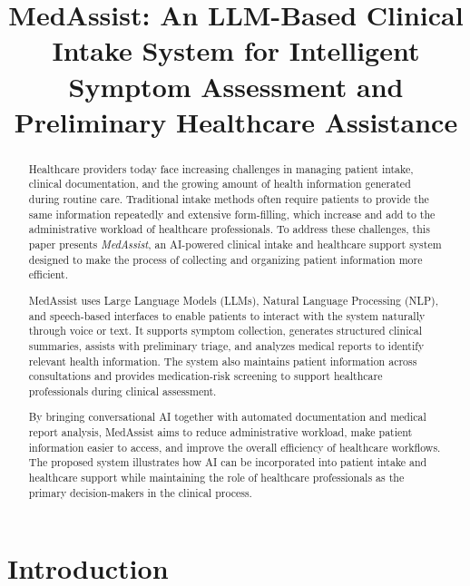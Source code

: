 \documentclass[conference]{IEEEtran}
\begin{document}
\raggedbottom

\title{MedAssist: An LLM-Based Clinical Intake System for Intelligent Symptom Assessment and Preliminary Healthcare Assistance}

\author{
}

\maketitle

\begin{abstract}
Healthcare providers today face increasing challenges in managing patient intake, clinical documentation, and the growing amount of health information generated during routine care. Traditional intake methods often require patients to provide the same information repeatedly and extensive form-filling, which increase and add to the administrative workload of healthcare professionals. To address these challenges, this paper presents \textit{MedAssist}, an AI-powered clinical intake and healthcare support system designed to make the process of collecting and organizing patient information more efficient.

MedAssist uses Large Language Models (LLMs), Natural Language Processing (NLP), and speech-based interfaces to enable patients to interact with the system naturally through voice or text. It supports symptom collection, generates structured clinical summaries, assists with preliminary triage, and analyzes medical reports to identify relevant health information. The system also maintains patient information across consultations and provides medication-risk screening to support healthcare professionals during clinical assessment.

By bringing conversational AI together with automated documentation and medical report analysis, MedAssist aims to reduce administrative workload, make patient information easier to access, and improve the overall efficiency of healthcare workflows. The proposed system illustrates how AI can be incorporated into patient intake and healthcare support while maintaining the role of healthcare professionals as the primary decision-makers in the clinical process.

\end{abstract}


\section{Introduction}
\end{document}
